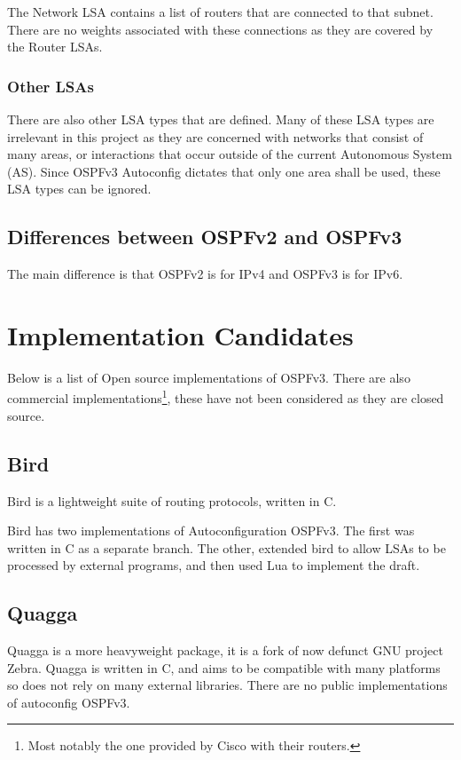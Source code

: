 \documentclass[12pt]{report}
\begin{document}
The Network LSA contains a list of routers that are connected to that subnet.
There are no weights associated with these connections as they are covered by
the Router LSAs. 

\subsubsection{Other LSAs}
There are also other LSA types that are defined.  Many of these LSA types are
irrelevant in this project as they are concerned with networks that consist of
many areas, or interactions that occur outside of the current Autonomous System
(AS). Since OSPFv3 Autoconfig dictates that only one area shall be used, these
LSA types can be ignored.   

\subsection{Differences between OSPFv2 and OSPFv3}
The main difference is that OSPFv2 is for IPv4 and OSPFv3 is for IPv6. 

\section{Implementation Candidates}
Below is a list of Open source implementations of OSPFv3\@. There are also
commercial implementations\footnote{Most notably the one provided by Cisco with
their routers.}, these have not been considered as they are closed source. 

\subsection{Bird}
Bird\cite{BirdHome} is a lightweight suite of routing protocols, written
in C. 

Bird has two implementations of Autoconfiguration OSPFv3. The first was written
in C as a separate branch. The other, extended bird to allow LSAs to be
processed by external programs, and then used Lua to implement the draft.

\subsection{Quagga}
Quagga\cite{QuaggaHome} is a more heavyweight package, it is a fork of now
defunct GNU project Zebra. Quagga is written in C, and aims to be
compatible with many platforms so does not rely on many external libraries.
There are no public implementations of autoconfig OSPFv3.
\end{document}

